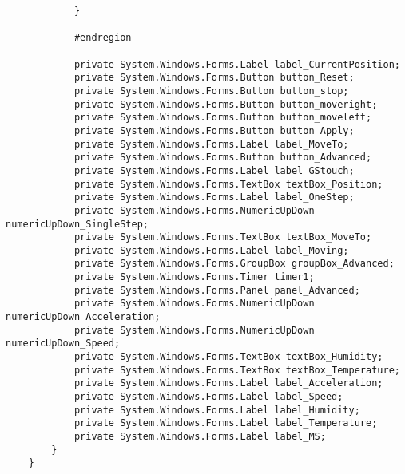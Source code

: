 \begin{lstlisting}
			}
			
			#endregion
			
			private System.Windows.Forms.Label label_CurrentPosition;
			private System.Windows.Forms.Button button_Reset;
			private System.Windows.Forms.Button button_stop;
			private System.Windows.Forms.Button button_moveright;
			private System.Windows.Forms.Button button_moveleft;
			private System.Windows.Forms.Button button_Apply;
			private System.Windows.Forms.Label label_MoveTo;
			private System.Windows.Forms.Button button_Advanced;
			private System.Windows.Forms.Label label_GStouch;
			private System.Windows.Forms.TextBox textBox_Position;
			private System.Windows.Forms.Label label_OneStep;
			private System.Windows.Forms.NumericUpDown numericUpDown_SingleStep;
			private System.Windows.Forms.TextBox textBox_MoveTo;
			private System.Windows.Forms.Label label_Moving;
			private System.Windows.Forms.GroupBox groupBox_Advanced;
			private System.Windows.Forms.Timer timer1;
			private System.Windows.Forms.Panel panel_Advanced;
			private System.Windows.Forms.NumericUpDown numericUpDown_Acceleration;
			private System.Windows.Forms.NumericUpDown numericUpDown_Speed;
			private System.Windows.Forms.TextBox textBox_Humidity;
			private System.Windows.Forms.TextBox textBox_Temperature;
			private System.Windows.Forms.Label label_Acceleration;
			private System.Windows.Forms.Label label_Speed;
			private System.Windows.Forms.Label label_Humidity;
			private System.Windows.Forms.Label label_Temperature;
			private System.Windows.Forms.Label label_MS;
		}
	}
\end{lstlisting}

